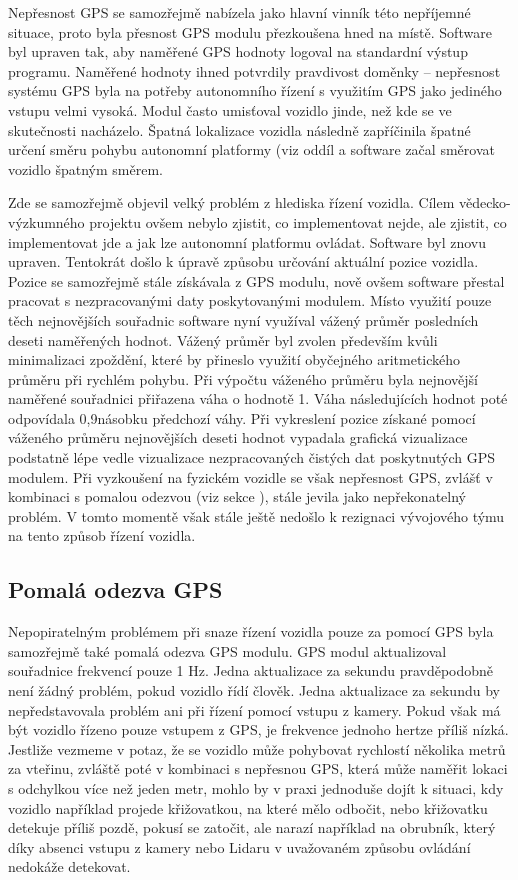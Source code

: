 \documentclass[czech, bachelor]{diploma}
\begin{document}
Nepřesnost GPS se samozřejmě nabízela jako hlavní vinník této nepříjemné situace, proto byla přesnost GPS modulu přezkoušena hned
na místě. Software byl upraven tak, aby naměřené GPS hodnoty logoval na standardní výstup programu. Naměřené hodnoty ihned 
potvrdily pravdivost doměnky -- nepřesnost systému GPS byla na potřeby autonomního řízení s využitím GPS jako jediného vstupu 
velmi vysoká. Modul často umisťoval vozidlo jinde, než kde se ve skutečnosti nacházelo. Špatná lokalizace vozidla následně 
zapříčinila špatné určení směru pohybu autonomní platformy (viz oddíl  a software začal směrovat
vozidlo špatným směrem.

Zde se samozřejmě objevil velký problém z hlediska řízení vozidla. Cílem vědecko-výzkumného projektu ovšem nebylo zjistit, co
implementovat nejde, ale zjistit, co implementovat jde a jak lze autonomní platformu ovládat. Software byl znovu upraven. 
Tentokrát došlo k úpravě způsobu určování aktuální pozice vozidla. Pozice se samozřejmě stále získávala z GPS modulu, nově ovšem
software přestal pracovat s nezpracovanými daty poskytovanými modulem. Místo využití pouze těch nejnovějších souřadnic software 
nyní využíval vážený průměr posledních deseti naměřených hodnot. Vážený průměr byl zvolen především kvůli minimalizaci zpoždění,
které by přineslo využití obyčejného aritmetického průměru při rychlém pohybu. Při výpočtu váženého průměru byla nejnovější 
naměřené souřadnici přiřazena váha o hodnotě 1. Váha následujících hodnot poté odpovídala 0,9násobku předchozí váhy. 
Při vykreslení pozice získané pomocí váženého průměru nejnovějších deseti hodnot vypadala grafická vizualizace podstatně lépe 
vedle vizualizace nezpracovaných čistých dat poskytnutých GPS modulem. Při vyzkoušení na fyzickém vozidle se však nepřesnost GPS,
zvlášť v kombinaci s pomalou odezvou (viz sekce ), stále jevila jako nepřekonatelný problém. V tomto
momentě však stále ještě nedošlo k rezignaci vývojového týmu na tento způsob řízení vozidla.

\subsection{Pomalá odezva GPS} 

Nepopiratelným problémem při snaze řízení vozidla pouze za pomocí GPS byla samozřejmě také pomalá odezva GPS modulu. GPS modul
aktualizoval souřadnice frekvencí pouze 1 Hz. Jedna aktualizace za sekundu pravděpodobně není žádný problém, pokud vozidlo řídí
člověk. Jedna aktualizace za sekundu by nepředstavovala problém ani při řízení pomocí vstupu z kamery. Pokud však má být vozidlo
řízeno pouze vstupem z GPS, je frekvence jednoho hertze příliš nízká. Jestliže vezmeme v potaz, že se vozidlo může pohybovat
rychlostí několika metrů za vteřinu, zvláště poté v kombinaci s nepřesnou GPS, která může naměřit lokaci s odchylkou více než
jeden metr, mohlo by v praxi jednoduše dojít k situaci, kdy vozidlo například projede křižovatkou, na které mělo odbočit, nebo
křižovatku detekuje příliš pozdě, pokusí se zatočit, ale narazí například na obrubník, který díky absenci vstupu z kamery nebo
Lidaru v uvažovaném způsobu ovládání nedokáže detekovat.
\end{document}
